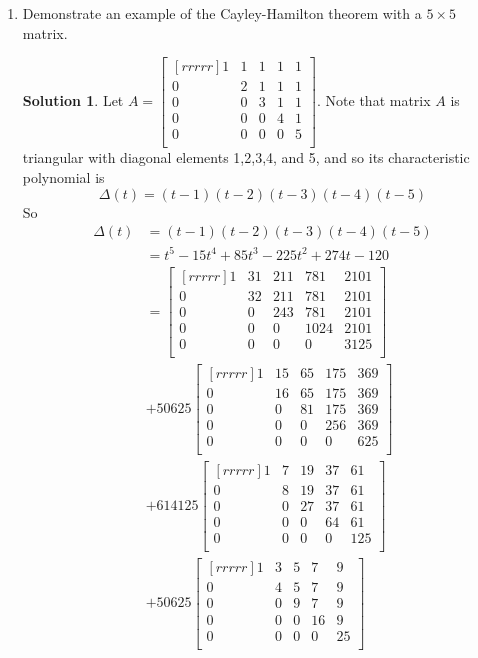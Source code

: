 \documentclass[12pt]{article}
\theoremstyle{definition}
\newtheorem*{solution}{Solution} %
\theoremstyle{plain}
\begin{document}
\begin{enumerate}
\item Demonstrate an example of the Cayley-Hamilton theorem with a $5 \times 5$ matrix.
\begin{solution}
Let $A=\begin{bmatrix}[rrrrr]1&1&1&1&1\\0&2&1&1&1\\0&0&3&1&1\\0&0&0&4&1\\0&0&0&0&5\\\end{bmatrix}$.
Note that matrix $A$ is triangular with diagonal elements 1,2,3,4, and 5, and so its characteristic polynomial is
\[ \Delta(t)=(t-1)(t-2)(t-3)(t-4)(t-5) \]
So
\begin{align*}
\Delta(t)&=(t-1)(t-2)(t-3)(t-4)(t-5)\\
&= t^5 - 15 t^4 + 85 t^3 - 225 t^2 + 274 t - 120\\
&= \begin{bmatrix}[rrrrr]
	1&31&211&781&2101\\
	0&32&211&781&2101\\
	0&0&243&781&2101\\
	0&0&0&1024&2101\\
	0&0&0&0&3125\\\end{bmatrix}\\
	&+
	50625 \begin{bmatrix}[rrrrr]
	1&15&65&175&369\\
	0&16&65&175&369\\
	0&0&81&175&369\\
	0&0&0&256&369\\
	0&0&0&0&625\\\end{bmatrix}\\
	&+
	614125\begin{bmatrix}[rrrrr]
	1&7&19&37&61\\
	0&8&19&37&61\\
	0&0&27&37&61\\
	0&0&0&64&61\\
	0&0&0&0&125\\\end{bmatrix}\\
	&+
	50625\begin{bmatrix}[rrrrr]
	1&3&5&7&9\\
	0&4&5&7&9\\
	0&0&9&7&9\\
	0&0&0&16&9\\
	0&0&0&0&25\\\end{bmatrix}\\

\end{align*}
\end{solution}
\end{enumerate}
\end{document}
